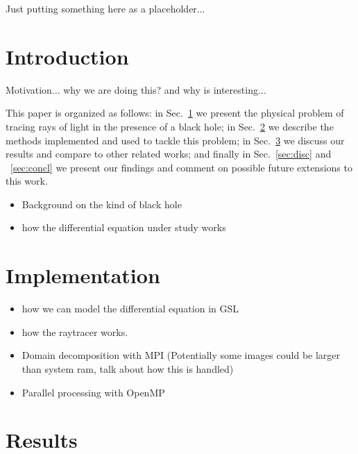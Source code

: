 Just putting something here as a placeholder...



\section{Introduction}
\label{sec:intro}



Motivation... why we are doing this? and why is interesting...


This paper is organized as follows:
in Sec.~\ref{sec:intro} we present the physical problem of tracing rays of light in the presence of a black hole;
in Sec.~\ref{sec:impl} we describe the methods implemented and used to tackle this problem;
in Sec.~\ref{sec:results} we discuss our results and compare to other related works;
and finally in Sec.~\ref{sec:disc} and ~\ref{sec:concl} we present our findings and comment
on possible future extensions to this work.


\begin{itemize}
	\item Background on the kind of black hole
	\item how the differential equation under study works
\end{itemize}



\section{Implementation}
\label{sec:impl}

\begin{itemize}
	\item how we can model the differential equation in GSL
    	\item how the raytracer works.
    	\item Domain decomposition with MPI (Potentially some images could be larger than system ram, talk about how this is handled)
    	\item Parallel processing with OpenMP
\end{itemize}


\section{Results}
\label{sec:results}

